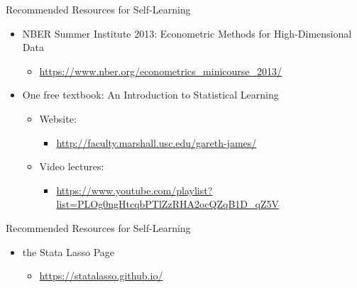 \documentclass[hyperref={pdfpagelabels=false}]{beamer}
\begin{document}
	
\begin{frame}{Recommended Resources for Self-Learning}
	\begin{itemize}
		\item NBER Summer Institute 2013: Econometric Methods for High-Dimensional
		Data
		\vspace{0.2cm}
		\begin{itemize}
			\item \url{https://www.nber.org/econometrics_minicourse_2013/}
	\vspace{0.2cm}
		\end{itemize}
		\item One free textbook: An Introduction to Statistical Learning
		\vspace{0.2cm}
		\begin{itemize}
			\item Website: 
							\vspace{0.2cm} 
					\begin{itemize}
			\item \url{http://faculty.marshall.usc.edu/gareth-james/}
				\vspace{0.2cm}
						\end{itemize}
			\item Video lectures:  
							\vspace{0.2cm} 
								\begin{itemize}
			\item \url{https://www.youtube.com/playlist?list=PLOg0ngHtcqbPTlZzRHA2ocQZqB1D_qZ5V}
									\end{itemize}
		\end{itemize}

	

	
	\end{itemize}
\end{frame}


\begin{frame}{Recommended Resources for Self-Learning}
\begin{itemize}
	\item the Stata Lasso Page
	\vspace{0.2cm}
	\begin{itemize}
		\item \url{https://statalasso.github.io/}
		\vspace{0.2cm}
	\end{itemize}
	
	
	
\end{itemize}
\end{frame}
\end{document}
